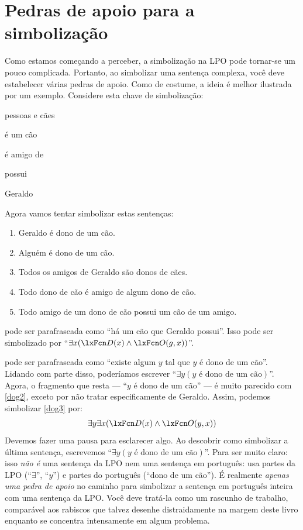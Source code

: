 \section{Pedras de apoio para a simbolização}
Como estamos começando a perceber, a simbolização na LPO pode tornar-se um pouco complicada. Portanto, ao simbolizar uma sentença complexa, você deve estabelecer várias pedras de apoio. Como de costume, a ideia é melhor ilustrada por um exemplo. Considere esta chave de simbolização:
\begin{ekey}
\item[\text{domínio}] pessoas e cães
\item[\atom{D}{x}]  é um cão
\item[\atom{F}{x,y}]  é amigo de 
\item[\atom{O}{x,y}]  possui 
\item[g] Geraldo
\end{ekey}
Agora vamos tentar simbolizar estas sentenças:
\begin{enumerate}
\item\label{dog2} Geraldo é dono de um cão.
\item\label{dog3} Alguém é dono de um cão.
\item\label{dog4} Todos os amigos de Geraldo são donos de cães.
\item\label{dog5} Todo dono de cão é amigo de algum dono de cão.
\item\label{dog6} Todo amigo de um dono de cão possui um cão de um amigo.
\end{enumerate}
 pode ser parafraseada como \textquotedblleft há um cão que Geraldo possui\textquotedblright{}. Isso pode ser simbolizado por \textquotedblleft $\exists x(\atom{D}{x} \eand \atom{O}{g,x})$\textquotedblright{}.

 pode ser parafraseada como \textquotedblleft existe algum $y$ tal que $y$ é dono de um cão\textquotedblright{}. Lidando com parte disso, poderíamos escrever \textquotedblleft $\exists y(y\text{ é dono de um cão})$\textquotedblright{}. Agora, o fragmento que resta — \textquotedblleft $y$ é dono de um cão\textquotedblright{} — é muito parecido com \cref*{dog2}, exceto por não tratar especificamente de Geraldo. Assim, podemos simbolizar \cref*{dog3} por:
$$\exists y \exists x(\atom{D}{x} \eand \atom{O}{y,x})$$
Devemos fazer uma pausa para esclarecer algo. Ao descobrir como simbolizar a última sentença, escrevemos \textquotedblleft $\exists y(y\text{ é
dono de um cão})$\textquotedblright{}. Para ser muito claro: isso \emph{não é} uma sentença da LPO nem uma sentença em português: usa partes da LPO (\textquotedblleft $\exists$\textquotedblright{}, \textquotedblleft $y$\textquotedblright{}) e partes do português (\textquotedblleft dono de um cão\textquotedblright{}). É realmente \emph{apenas uma pedra de apoio} no caminho para simbolizar a sentença em português inteira com uma sentença da LPO. Você deve tratá-la como um rascunho de trabalho, comparável aos rabiscos que talvez desenhe distraidamente na margem deste livro enquanto se concentra intensamente em algum problema.









